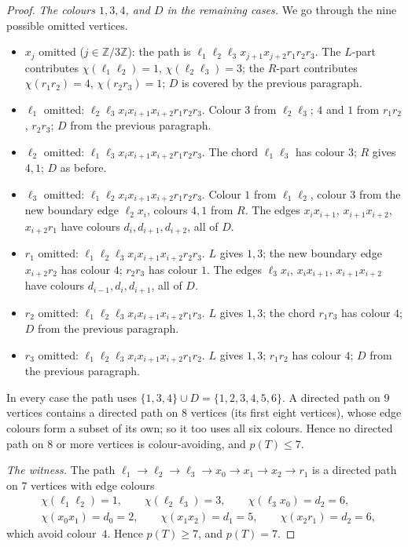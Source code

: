 \documentclass[11pt,a4paper]{article}
\theoremstyle{plain}
\theoremstyle{definition}
\theoremstyle{remark}
\newcommand{\Z}{\mathbb Z}
\newcommand{\col}{\chi}
\newcommand{\pth}{p}
\newcommand{\lv}{\ell}
\begin{document}
\begin{proof}
\emph{The colours $1,3,4$, and $D$ in the remaining cases.} We go through the nine possible omitted vertices.
\begin{itemize}[nosep]
\item $x_j$ omitted ($j\in\Z/3\Z$): the path is $\lv_1\lv_2\lv_3x_{j+1}x_{j+2}r_1r_2r_3$. The $L$-part contributes $\col(\lv_1\lv_2)=1$, $\col(\lv_2\lv_3)=3$; the $R$-part contributes $\col(r_1r_2)=4$, $\col(r_2r_3)=1$; $D$ is covered by the previous paragraph.
\item $\lv_1$ omitted: $\lv_2\lv_3x_ix_{i+1}x_{i+2}r_1r_2r_3$. Colour $3$ from $\lv_2\lv_3$; $4$ and $1$ from $r_1r_2$, $r_2r_3$; $D$ from the previous paragraph.
\item $\lv_2$ omitted: $\lv_1\lv_3x_ix_{i+1}x_{i+2}r_1r_2r_3$. The chord $\lv_1\lv_3$ has colour $3$; $R$ gives $4,1$; $D$ as before.
\item $\lv_3$ omitted: $\lv_1\lv_2x_ix_{i+1}x_{i+2}r_1r_2r_3$. Colour $1$ from $\lv_1\lv_2$, colour $3$ from the new boundary edge $\lv_2x_i$, colours $4,1$ from $R$. The edges $x_ix_{i+1}$, $x_{i+1}x_{i+2}$, $x_{i+2}r_1$ have colours $d_i,d_{i+1},d_{i+2}$, all of $D$.
\item $r_1$ omitted: $\lv_1\lv_2\lv_3x_ix_{i+1}x_{i+2}r_2r_3$. $L$ gives $1,3$; the new boundary edge $x_{i+2}r_2$ has colour $4$; $r_2r_3$ has colour $1$. The edges $\lv_3x_i$, $x_ix_{i+1}$, $x_{i+1}x_{i+2}$ have colours $d_{i-1},d_i,d_{i+1}$, all of $D$.
\item $r_2$ omitted: $\lv_1\lv_2\lv_3x_ix_{i+1}x_{i+2}r_1r_3$. $L$ gives $1,3$; the chord $r_1r_3$ has colour $4$; $D$ from the previous paragraph.
\item $r_3$ omitted: $\lv_1\lv_2\lv_3x_ix_{i+1}x_{i+2}r_1r_2$. $L$ gives $1,3$; $r_1r_2$ has colour $4$; $D$ from the previous paragraph.
\end{itemize}
In every case the path uses $\{1,3,4\}\cup D=\{1,2,3,4,5,6\}$. A directed path on $9$ vertices contains a directed path on $8$ vertices (its first eight vertices), whose edge colours form a subset of its own; so it too uses all six colours. Hence no directed path on $8$ or more vertices is colour-avoiding, and $\pth(T)\le7$.

\emph{The witness.} The path $\lv_1\to\lv_2\to\lv_3\to x_0\to x_1\to x_2\to r_1$ is a directed path on $7$ vertices with edge colours
\begin{align*}
 &\col(\lv_1\lv_2)=1,\qquad \col(\lv_2\lv_3)=3,\qquad \col(\lv_3x_0)=d_2=6,\\
 &\col(x_0x_1)=d_0=2,\qquad \col(x_1x_2)=d_1=5,\qquad \col(x_2r_1)=d_2=6,
\end{align*}
which avoid colour~$4$. Hence $\pth(T)\ge7$, and $\pth(T)=7$.
\end{proof}
\end{document}
